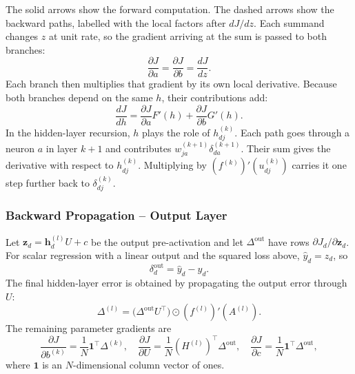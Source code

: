 \begin{mdframed}[style=discusion, frametitle={Backpropagation through a sum}]
The solid arrows show the forward computation. The dashed arrows show the backward paths, labelled with the local factors after $dJ/dz$. Each summand changes $z$ at unit rate, so the gradient arriving at the sum is passed to both branches:
\begin{equation*}
    \frac{\partial J}{\partial a}
    =\frac{\partial J}{\partial b}
    =\frac{dJ}{dz}.
\end{equation*}
Each branch then multiplies that gradient by its own local derivative. Because both branches depend on the same $h$, their contributions add:
\begin{equation*}
    \frac{dJ}{dh}
    =\frac{\partial J}{\partial a}F'(h)
    +\frac{\partial J}{\partial b}G'(h).
\end{equation*}
In the hidden-layer recursion, $h$ plays the role of $h_{dj}^{(k)}$. Each path goes through a neuron $a$ in layer $k+1$ and contributes $w_{ja}^{(k+1)}\delta_{da}^{(k+1)}$. Their sum gives the derivative with respect to $h_{dj}^{(k)}$. Multiplying by $(f^{(k)})'(u_{dj}^{(k)})$ carries it one step further back to $\delta_{dj}^{(k)}$.
\end{mdframed}

\subsubsection{Backward Propagation – Output Layer}

Let $\bm{z}_d=\bm{h}_d^{(l)}U+c$ be the output pre-activation and let $\Delta^{\mathrm{out}}$ have rows $\partial J_d/\partial\bm{z}_d$. For scalar regression with a linear output and the squared loss above, $\hat{y}_d=z_d$, so
\begin{equation}
    \label{eq:capa_output}
    \delta_d^{\mathrm{out}}=\hat{y}_d-y_d.
\end{equation}
The final hidden-layer error is obtained by propagating the output error through $U$:
\[
    \Delta^{(l)}=\bigl(\Delta^{\mathrm{out}}U^\top\bigr)
    \odot(f^{(l)})'(A^{(l)}).
\]
The remaining parameter gradients are
\begin{equation}
    \frac{\partial J}{\partial b^{(k)}}=\frac{1}{N}\mathbf{1}^\top\Delta^{(k)},\quad
    \frac{\partial J}{\partial U}=\frac{1}{N}(H^{(l)})^\top\Delta^{\mathrm{out}},\quad
    \frac{\partial J}{\partial c}=\frac{1}{N}\mathbf{1}^\top\Delta^{\mathrm{out}},
\end{equation}
where $\mathbf{1}$ is an $N$-dimensional column vector of ones.

